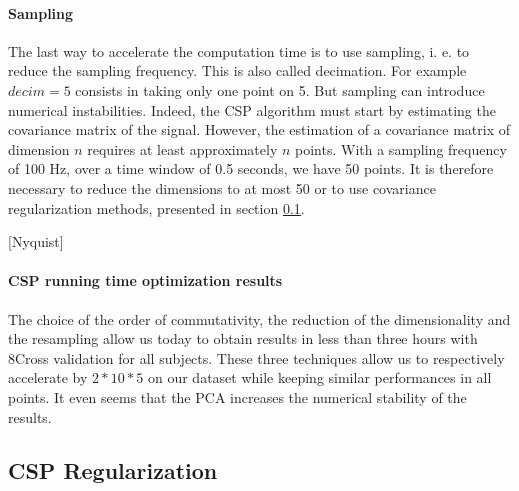 \paragraph{Sampling}

The last way to accelerate the computation time is to use sampling, i. e. to reduce the sampling frequency. This is also called decimation. For example $decim = 5$ consists in taking only one point on 5. But sampling can introduce numerical instabilities. Indeed, the CSP algorithm must start by estimating the covariance matrix of the signal. However, the estimation of a covariance matrix of dimension $n$ requires at least approximately $n$ points. With a sampling frequency of 100 Hz, over a time window of 0.5 seconds, we have 50 points. It is therefore necessary to reduce the dimensions to at most 50 or to use covariance regularization methods, presented in section \ref{CSP_regularization}.

[Nyquist]

\paragraph{CSP running time optimization results}

The choice of the order of commutativity, the reduction of the dimensionality and the resampling allow us today to obtain results in less than three hours with 8Cross validation for all subjects. These three techniques allow us to respectively accelerate by $2*10*5$ on our dataset while keeping similar performances in all points. It even seems that the PCA increases the numerical stability of the results.




\subsection{CSP Regularization}
\label{CSP_regularization}

